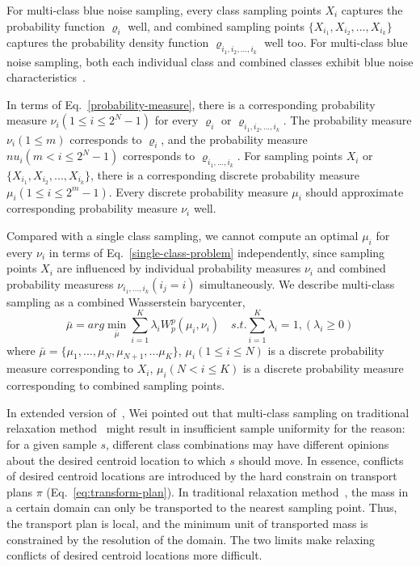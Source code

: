 For multi-class blue noise sampling,
every class sampling points $X_i$ captures the probability function $\varrho_i$ well,
and combined sampling points $\{X_{i_1}, X_{i_2},...,X_{i_k}\}$ captures the probability density function $\varrho_{i_1,i_2,...,i_k}$ well too.
For multi-class blue noise sampling,
both each individual class and combined classes exhibit blue noise characteristics~\cite{wei:2010:multi}.

In terms of Eq.~\ref{probability-measure},
there is a corresponding probability measure $\nu_i(1\leq i\leq 2^N-1)$ for every $\varrho_i$ or  $\varrho_{{i_1,i_2,...,i_k}}$.
The probability measure $\nu_i(1\leq m)$ corresponds to $\varrho_i$,
and the probability measure $nu_i(m<i\leq 2^N-1)$ corresponds to $\varrho_{i_1,...,i_k}$.
For sampling points $X_i$ or $\{X_{i_1}, X_{i_2},...,X_{i_k}\}$,
there is a corresponding discrete probability measure $\mu_i(1\leq i\leq 2^m-1)$.
Every discrete probability measure $\mu_i$ should approximate corresponding probability measure $\nu_i$ well.

Compared with a single class sampling,
we cannot compute an optimal $\mu_i$ for every $\nu_i$ in terms of Eq.~\ref{single-class-problem} independently,
since sampling points $X_i$ are influenced by individual probability measures $\nu_i$ and combined probability measuress $\nu_{i_1,...,i_k}(i_j=i)$ simultaneously.
We describe multi-class sampling as a combined Wasserstein barycenter,
\begin{equation}\label{eq:combined-wasserstein-barycenter}
 \bar\mu=arg\min\limits_{\bar\mu}\sum\limits_{i=1}^K\lambda_iW_p^p(\mu_i,\nu_i) \quad
  s.t.\sum\limits_{i=1}^K\lambda_i=1,(\lambda_i\geq0)
\end{equation}
where $\bar\mu=\{\mu_1,...,\mu_N,\mu_{N+1},...\mu_{K}\}$,
$\mu_i(1\leq i\leq N)$  is a discrete probability measure corresponding to $X_i$,
$\mu_i(N < i\leq K)$ is a discrete probability measure corresponding to combined sampling points.

In extended version of~\cite{wei:2010:multi},
Wei pointed out that multi-class sampling on traditional relaxation method~\cite{balzer:2009:capacity}
 might result in insufficient sample
uniformity for the reason: for a given sample $s$,
different class combinations may have different opinions about the desired centroid
location to which $s$ should move.
In essence,
conflicts of desired centroid locations are introduced by the hard constrain on transport plans $\pi$ (Eq.~\ref{eq:transform-plan}).
In traditional relaxation method~\cite{balzer:2009:capacity},
the mass in a certain domain can only be transported to the nearest sampling point.
Thus, the transport plan is local,
and the minimum unit of transported mass is constrained by the resolution of the domain.
The two limits make relaxing conflicts of desired centroid locations more difficult.

